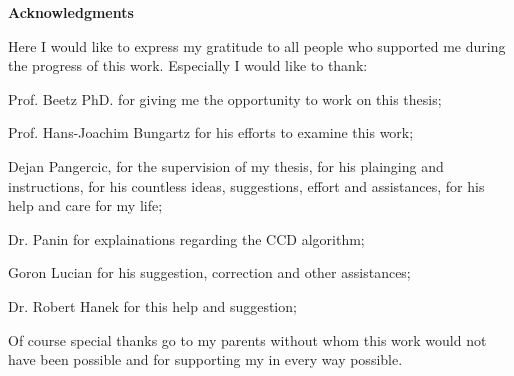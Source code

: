 \clearemptydoublepage
{}
{}	



\vspace*{2cm}

\begin{center}
{\Large \bf Acknowledgments}
\end{center}

\vspace{1cm}




Here I would like to express my gratitude to all people who supported me during the progress
of this work. Especially I would like to thank:

Prof. Beetz PhD. for giving me the opportunity to work on this thesis;

Prof. Hans-Joachim Bungartz for his efforts to examine this work;

Dejan Pangercic, for the supervision of my thesis, for his plainging and instructions, for his countless ideas, suggestions, effort and assistances, for his help and care for my life;

Dr. Panin for explainations regarding the CCD algorithm;

Goron Lucian for his suggestion, correction and other assistances;

Dr. Robert Hanek for this help and suggestion;


Of course special thanks go to my parents without whom this work would not have
been possible and for supporting my in every way possible.
